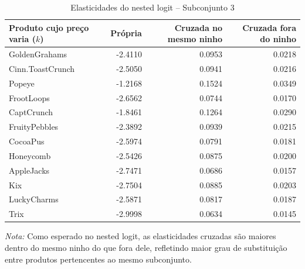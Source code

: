 \begingroup
\begin{table}[H]
\centering
\caption{Elasticidades do nested logit -- Subconjunto 3}
\label{tab:elas-nested-subset-3}
\scriptsize
\begin{tabular}{lrrr}
\toprule
Produto cujo preço varia ($k$) 
& Própria 
& Cruzada no mesmo ninho 
& Cruzada fora do ninho \\
\midrule
GoldenGrahams & -2.4110 & 0.0953 & 0.0218 \\
Cinn.ToastCrunch & -2.5050 & 0.0941 & 0.0216 \\
Popeye & -1.2168 & 0.1524 & 0.0349 \\
FrootLoops & -2.6562 & 0.0744 & 0.0170 \\
CaptCrunch & -1.8461 & 0.1264 & 0.0290 \\
FruityPebbles & -2.3892 & 0.0939 & 0.0215 \\
CocoaPus & -2.5974 & 0.0791 & 0.0181 \\
Honeycomb & -2.5426 & 0.0875 & 0.0200 \\
AppleJacks & -2.7471 & 0.0686 & 0.0157 \\
Kix & -2.7504 & 0.0885 & 0.0203 \\
LuckyCharms & -2.5871 & 0.0817 & 0.0187 \\
Trix & -2.9998 & 0.0634 & 0.0145 \\
\bottomrule
\end{tabular}

\vspace{0.3em}
\footnotesize
\textit{Nota:} Como esperado no nested logit, as elasticidades cruzadas são maiores dentro do mesmo ninho do que fora dele, refletindo maior grau de substituição entre produtos pertencentes ao mesmo subconjunto.
\end{table}
\endgroup